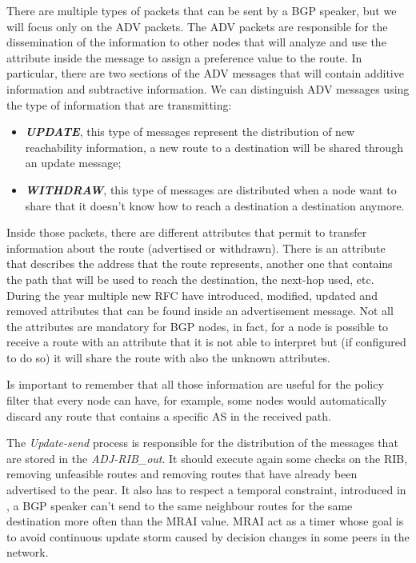 There are multiple types of packets that can be sent by a \ac{BGP} speaker, but
we will focus only on the \ac{ADV} packets.
The \ac{ADV} packets are responsible for the dissemination of the information
to other nodes that will analyze and use the attribute inside the message
to assign a preference value to the route.
In particular, there are two sections of the \ac{ADV} messages that will 
contain additive information and subtractive information.
We can distinguish \ac{ADV} messages using the type of information that are 
transmitting:
\begin{itemize}
	\item \textbf{\textit{UPDATE}}, this type of messages represent the distribution
		of new reachability information, a new route to a destination will be
		shared through an update message;
	\item \textbf{\textit{WITHDRAW}}, this type of messages are distributed when
		a node want to share that it doesn't know how to reach a destination
		a destination anymore.
\end{itemize}
Inside those packets, there are different attributes that permit to transfer 
information about the route (advertised or withdrawn).
There is an attribute that describes the address that the route represents,
another one that contains the path that will be used to reach the 
destination, the next-hop used, etc.
During the year multiple new \ac{RFC} have introduced, modified, updated and removed
attributes that can be found inside an advertisement message.
Not all the attributes are mandatory for \ac{BGP} nodes, in fact, for a node
is possible to receive a route with an attribute that it is not able to interpret
but (if configured to do so) it will share the route with also the unknown 
attributes.

Is important to remember that all those information are useful for the policy
filter that every node can have, for example, some nodes would automatically discard
any route that contains a specific \ac{AS} in the received path.

The \textit{Update-send} process is responsible for the distribution of the 
messages that are stored in the \textit{ADJ-RIB\_out}.
It should execute again some checks on the \ac{RIB}, removing unfeasible routes
and removing routes that have already been advertised to the pear.
It also has to respect a temporal constraint, introduced in \cite{rfc4271}, 
a \ac{BGP} speaker can't send to the same neighbour routes for the same destination
more often than the \ac{MRAI} value.
\ac{MRAI} act as a timer whose goal is to avoid continuous update storm caused
by decision changes in some peers in the network.

